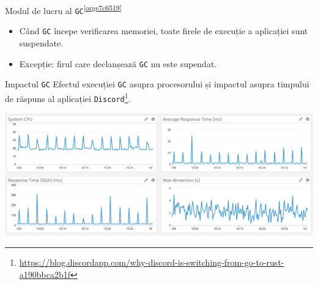 \documentclass[presentation]{beamer}
\begin{document}
\begin{frame}[label={sec:orga6b5ef8},fragile]{Modul de lucru al \texttt{GC}\textsuperscript{\ref{orge7c6519}}}
 \begin{itemize}
\item Când \texttt{GC} începe verificarea memoriei, toate firele de execuție a aplicației sunt suspendate.
\item Excepție: firul care declanșează \texttt{GC} nu este supendat.
\end{itemize}
\end{frame}
\begin{frame}[label={sec:org35a532e},fragile]{Impactul \texttt{GC}}
 Efectul execuției \texttt{GC} asupra procesorului și impactul asupra timpului de răspuns al aplicației \texttt{Discord}\footnote{\url{https://blog.discordapp.com/why-discord-is-switching-from-go-to-rust-a190bbca2b1f}}.
\begin{center}
\includegraphics[width=.9\linewidth]{img/gc-impact.png}
\end{center}
\end{frame}
\end{document}
